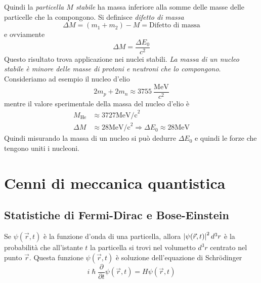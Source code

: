 Quindi la \textit{particella $M$ stabile} ha massa inferiore alla somme delle
masse delle particelle che la compongono. Si definisce \textit{difetto di massa}
\begin{equation}
 \Delta M = (m_1 + m_2) - M = \text{Difetto di massa}
\end{equation}
e ovviamente
\begin{equation}
\Delta M = \frac{\Delta E_0}{c^2}
\end{equation}
Questo risultato trova applicazione nei nuclei stabili. \textit{La massa di un
nucleo stabile è minore delle masse di protoni e neutroni che lo compongono}.
Consideriamo ad esempio il nucleo d'elio
\[
  2m_p + 2m_n \approx 3755 \ \dfrac{\text{MeV}}{c^2}
\]
mentre il valore sperimentale della massa del nucleo d'elio è
\begin{align*}
M_\text{He} &\approx 3727\text{MeV/c}^2\\
\Delta M &\approx 28\text{MeV/c}^2 \Rightarrow \Delta E_0 \approx 28\text{MeV}
\end{align*}
Quindi misurando la massa di un nucleo si può dedurre $\Delta E_0$ e quindi le forze che tengono uniti i nucleoni.

\chapter{Cenni di meccanica quantistica}

\section{Statistiche di Fermi-Dirac e Bose-Einstein}

Se $\psi(\vec{r},t)$ è la funzione d'onda di una particella, allora
$\left| \psi(\vec{r},t) \right|^2d^3r$ è la probabilità che all'istante $t$ la particella
si trovi nel volumetto $d^3r$ centrato nel punto $\vec{r}$. Questa funzione
$\psi(\vec{r},t)$ è soluzione dell'equazione di Schr\"odinger
\begin{equation}
 i\hslash \frac{\partial}{\partial t}\psi(\vec{r},t) = H \psi(\vec{r},t)
\end{equation}

